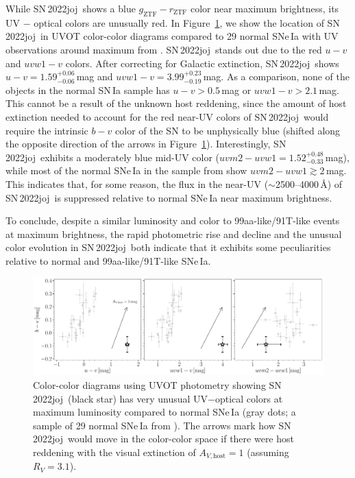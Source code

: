 \documentclass[twocolumn]{aastex631}
\newcommand{\sn}{SN\,2022joj}
\begin{document}
\begin{CJK*}{UTF8}{gbsn}
While \sn\ shows a blue $g_\mathrm{ZTF}-r_\mathrm{ZTF}$ color near maximum brightness, its UV $-$ optical colors are unusually red. In Figure~\ref{fig:UVOT}, we show the location of \sn\ in UVOT color-color diagrams compared to 29 normal SNe\,Ia with UV observations around maximum from \citet{Brown_2018}. \sn\ stands out due to the red $u-v$ and $uvw1-v$ colors. After correcting for Galactic extinction, \sn\ shows $u-v=1.59^{+0.06}_{-0.06}$\,mag and $uvw1 - v=3.99^{+0.23}_{-0.19}$\,mag. As a comparison, none of the objects in the normal SN\,Ia sample has $u-v>0.5$\,mag or $uvw1 - v>2.1$\,mag. This cannot be a result of the unknown host reddening, since the amount of host extinction needed to account for the red near-UV colors of \sn\ would require the intrinsic $b-v$ color of the SN to be unphysically blue (shifted along the opposite direction of the arrows in Figure~\ref{fig:UVOT}). Interestingly, \sn\ exhibits a moderately blue mid-UV color ($uvm2-uvw1=1.52^{+0.48}_{-0.33}$\,mag), while most of the normal SNe\,Ia in the sample from \citet{Brown_2018} show $uvm2-uvw1\gtrsim2$\,mag. This indicates that, for some reason, the flux in the near-UV ($\sim$2500--4000\,\r{A}) of \sn\ is suppressed relative to normal SNe\,Ia near maximum brightness.

To conclude, despite a similar luminosity and color to 99aa-like/91T-like events at maximum brightness, the rapid photometric rise and decline and the unusual color evolution in \sn\ both indicate that it exhibits some peculiarities relative to normal and 99aa-like/91T-like SNe\,Ia.

\begin{figure}
    \centering
    \includegraphics[width=\linewidth]{UVOT_colors.pdf}
    \caption{Color-color diagrams using UVOT photometry showing \sn\ (black star) has very unusual UV$-$optical colors at maximum luminosity compared to normal SNe\,Ia (gray dots; a sample of 29 normal SNe\,Ia from \citealp{Brown_2018}). The arrows mark how \sn\ would move in the color-color space if there were host reddening with the visual extinction of $A_{V,\mathrm{host}}=1$ (assuming $R_V=3.1$).
    }
    \label{fig:UVOT}
\end{figure}



\end{CJK*}
\end{document}
